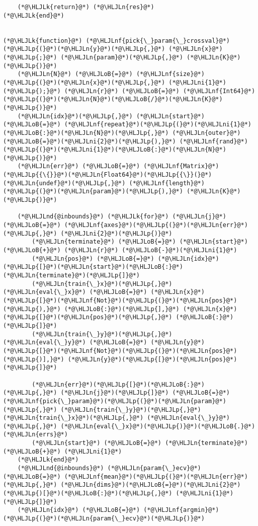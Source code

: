 \documentclass[12pt,a4paper]{article}
\newcommand{\HLJLk}[1]{\textcolor[RGB]{148,91,176}{\textbf{#1}}}
\newcommand{\HLJLn}[1]{#1}
\newcommand{\HLJLnd}[1]{\textcolor[RGB]{214,102,97}{#1}}
\newcommand{\HLJLnf}[1]{\textcolor[RGB]{66,102,213}{#1}}
\newcommand{\HLJLni}[1]{\textcolor[RGB]{59,151,46}{#1}}
\newcommand{\HLJLoB}[1]{\textcolor[RGB]{102,102,102}{\textbf{#1}}}
\newcommand{\HLJLp}[1]{#1}
\begin{document}
\begin{lstlisting}
    (*@\HLJLk{return}@*) (*@\HLJLn{res}@*)
(*@\HLJLk{end}@*)


(*@\HLJLk{function}@*) (*@\HLJLnf{pick{\_}param{\_}crossval}@*)(*@\HLJLp{(}@*)(*@\HLJLn{y}@*)(*@\HLJLp{,}@*) (*@\HLJLn{x}@*)(*@\HLJLp{;}@*) (*@\HLJLn{param}@*)(*@\HLJLp{,}@*) (*@\HLJLn{K}@*)(*@\HLJLp{)}@*)
    (*@\HLJLn{N}@*) (*@\HLJLoB{=}@*) (*@\HLJLnf{size}@*)(*@\HLJLp{(}@*)(*@\HLJLn{x}@*)(*@\HLJLp{,}@*) (*@\HLJLni{1}@*)(*@\HLJLp{);}@*) (*@\HLJLn{r}@*) (*@\HLJLoB{=}@*) (*@\HLJLnf{Int64}@*)(*@\HLJLp{(}@*)(*@\HLJLn{N}@*)(*@\HLJLoB{/}@*)(*@\HLJLn{K}@*)(*@\HLJLp{)}@*)
    (*@\HLJLn{idx}@*)(*@\HLJLp{,}@*) (*@\HLJLn{start}@*) (*@\HLJLoB{=}@*) (*@\HLJLnf{repeat}@*)(*@\HLJLp{(}@*)(*@\HLJLni{1}@*)(*@\HLJLoB{:}@*)(*@\HLJLn{N}@*)(*@\HLJLp{,}@*) (*@\HLJLn{outer}@*)(*@\HLJLoB{=}@*)(*@\HLJLni{2}@*)(*@\HLJLp{),}@*) (*@\HLJLnf{rand}@*)(*@\HLJLp{(}@*)(*@\HLJLni{1}@*)(*@\HLJLoB{:}@*)(*@\HLJLn{N}@*)(*@\HLJLp{)}@*)
    (*@\HLJLn{err}@*) (*@\HLJLoB{=}@*) (*@\HLJLnf{Matrix}@*)(*@\HLJLp{{\{}}@*)(*@\HLJLn{Float64}@*)(*@\HLJLp{{\}}(}@*)(*@\HLJLn{undef}@*)(*@\HLJLp{,}@*) (*@\HLJLnf{length}@*)(*@\HLJLp{(}@*)(*@\HLJLn{param}@*)(*@\HLJLp{),}@*) (*@\HLJLn{K}@*)(*@\HLJLp{)}@*)

    (*@\HLJLnd{@inbounds}@*) (*@\HLJLk{for}@*) (*@\HLJLn{j}@*) (*@\HLJLoB{=}@*) (*@\HLJLnf{axes}@*)(*@\HLJLp{(}@*)(*@\HLJLn{err}@*)(*@\HLJLp{,}@*) (*@\HLJLni{2}@*)(*@\HLJLp{)}@*)
        (*@\HLJLn{terminate}@*) (*@\HLJLoB{=}@*) (*@\HLJLn{start}@*) (*@\HLJLoB{+}@*) (*@\HLJLn{r}@*) (*@\HLJLoB{-}@*)(*@\HLJLni{1}@*)
        (*@\HLJLn{pos}@*) (*@\HLJLoB{=}@*) (*@\HLJLn{idx}@*)(*@\HLJLp{[}@*)(*@\HLJLn{start}@*)(*@\HLJLoB{:}@*)(*@\HLJLn{terminate}@*)(*@\HLJLp{]}@*)
        (*@\HLJLn{train{\_}x}@*)(*@\HLJLp{,}@*) (*@\HLJLn{eval{\_}x}@*) (*@\HLJLoB{=}@*) (*@\HLJLn{x}@*)(*@\HLJLp{[}@*)(*@\HLJLnf{Not}@*)(*@\HLJLp{(}@*)(*@\HLJLn{pos}@*)(*@\HLJLp{),}@*) (*@\HLJLoB{:}@*)(*@\HLJLp{],}@*) (*@\HLJLn{x}@*)(*@\HLJLp{[}@*)(*@\HLJLn{pos}@*)(*@\HLJLp{,}@*) (*@\HLJLoB{:}@*)(*@\HLJLp{]}@*)
        (*@\HLJLn{train{\_}y}@*)(*@\HLJLp{,}@*) (*@\HLJLn{eval{\_}y}@*) (*@\HLJLoB{=}@*) (*@\HLJLn{y}@*)(*@\HLJLp{[}@*)(*@\HLJLnf{Not}@*)(*@\HLJLp{(}@*)(*@\HLJLn{pos}@*)(*@\HLJLp{)],}@*) (*@\HLJLn{y}@*)(*@\HLJLp{[}@*)(*@\HLJLn{pos}@*)(*@\HLJLp{]}@*)

        (*@\HLJLn{err}@*)(*@\HLJLp{[}@*)(*@\HLJLoB{:}@*)(*@\HLJLp{,}@*) (*@\HLJLn{j}@*)(*@\HLJLp{]}@*) (*@\HLJLoB{=}@*) (*@\HLJLnf{pick{\_}param}@*)(*@\HLJLp{(}@*)(*@\HLJLn{param}@*)(*@\HLJLp{,}@*) (*@\HLJLn{train{\_}y}@*)(*@\HLJLp{,}@*) (*@\HLJLn{train{\_}x}@*)(*@\HLJLp{,}@*) (*@\HLJLn{eval{\_}y}@*)(*@\HLJLp{,}@*) (*@\HLJLn{eval{\_}x}@*)(*@\HLJLp{)}@*)(*@\HLJLoB{.}@*)(*@\HLJLn{errs}@*)
        (*@\HLJLn{start}@*) (*@\HLJLoB{=}@*) (*@\HLJLn{terminate}@*) (*@\HLJLoB{+}@*) (*@\HLJLni{1}@*)
    (*@\HLJLk{end}@*)
    (*@\HLJLnd{@inbounds}@*) (*@\HLJLn{param{\_}ecv}@*) (*@\HLJLoB{=}@*) (*@\HLJLnf{mean}@*)(*@\HLJLp{(}@*)(*@\HLJLn{err}@*)(*@\HLJLp{,}@*) (*@\HLJLn{dims}@*)(*@\HLJLoB{=}@*)(*@\HLJLni{2}@*)(*@\HLJLp{)[}@*)(*@\HLJLoB{:}@*)(*@\HLJLp{,}@*) (*@\HLJLni{1}@*)(*@\HLJLp{]}@*)
    (*@\HLJLn{idx}@*) (*@\HLJLoB{=}@*) (*@\HLJLnf{argmin}@*)(*@\HLJLp{(}@*)(*@\HLJLn{param{\_}ecv}@*)(*@\HLJLp{)}@*)


\end{lstlisting}
\end{document}

